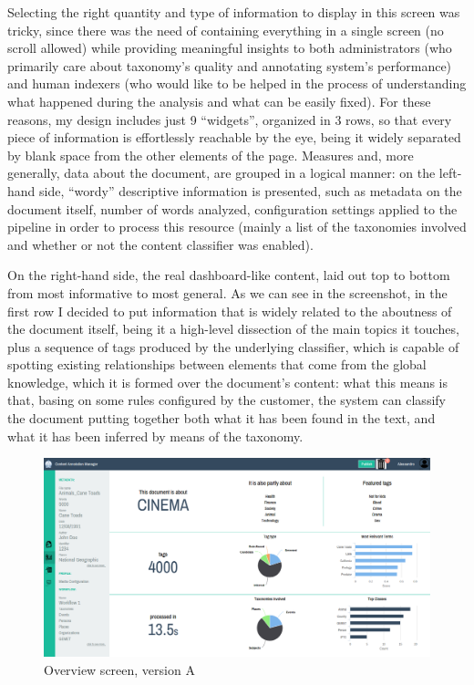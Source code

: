 \documentclass[12pt,oneside,svgnames]{memoir}
\begin{document}
Selecting the right quantity and type of information to display in this
screen was tricky, since there was the need of containing everything in
a single screen (no scroll allowed) while providing meaningful insights
to both administrators (who primarily care about taxonomy's quality and
annotating system's performance) and human indexers (who would like to
be helped in the process of understanding what happened during the
analysis and what can be easily fixed). For these reasons, my design
includes just 9 ``widgets'', organized in 3 rows, so that every piece of
information is effortlessly reachable by the eye, being it widely
separated by blank space from the other elements of the page. Measures
and, more generally, data about the document, are grouped in a logical
manner: on the left-hand side, ``wordy'' descriptive information is
presented, such as metadata on the document itself, number of words
analyzed, configuration settings applied to the pipeline in order to
process this resource (mainly a list of the taxonomies involved and
whether or not the content classifier was enabled).

On the right-hand side, the real dashboard-like content, laid out top to
bottom from most informative to most general. As we can see in the
screenshot, in the first row I decided to put information that is widely
related to the aboutness of the document itself, being it a high-level
dissection of the main topics it touches, plus a sequence of tags
produced by the underlying classifier, which is capable of spotting
existing relationships between elements that come from the global
knowledge, which it is formed over the document's content: what this
means is that, basing on some rules configured by the customer, the
system can classify the document putting together both what it has been
found in the text, and what it has been inferred by means of the
taxonomy.

\begin{figure}[htbp]
\centering
\includegraphics{./src/img/overview-A.png}
\caption{Overview screen, version A}
\end{figure}
\end{document}
